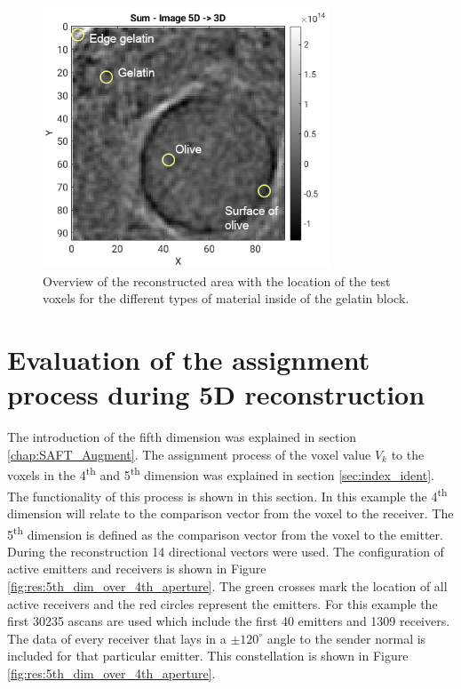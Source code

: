 \begin{figure}[H]
    \centering
    \includegraphics[width=0.76\textwidth]{Graphics/Results/Variance_Image/stone_skin_pulp_location.png}
    \caption{Overview of the reconstructed area with the location of the test voxels for the different types of material inside of the gelatin block.}
    \label{fig:different_tisue_types}
\end{figure}
    


\section{Evaluation of the assignment process during 5D reconstruction}
The introduction of the fifth dimension was explained in section \ref{chap:SAFT_Augment}. The assignment process of the  voxel value $V_k$ to the voxels in the 4\textsuperscript{th} and 5\textsuperscript{th} dimension was explained in section \ref{sec:index_ident}. The functionality of this process is shown in this section. In this example the 4\textsuperscript{th} dimension will relate to the comparison vector from the voxel to the receiver. The 5\textsuperscript{th} dimension is defined as the comparison vector from the voxel to the emitter. During the reconstruction 14 directional vectors were used. 
The configuration of active emitters and receivers is shown in Figure \ref{fig:res:5th_dim_over_4th_aperture}. The green crosses mark the location of all active receivers and the red circles represent the emitters. For this example the first 30235 \acp{ascan} are used which include the first 40 emitters and 1309 receivers. The data of every receiver that lays in a $\pm 120^{\circ}$ angle to the sender normal is included for that particular emitter. This constellation is shown in Figure \ref{fig:res:5th_dim_over_4th_aperture}.

